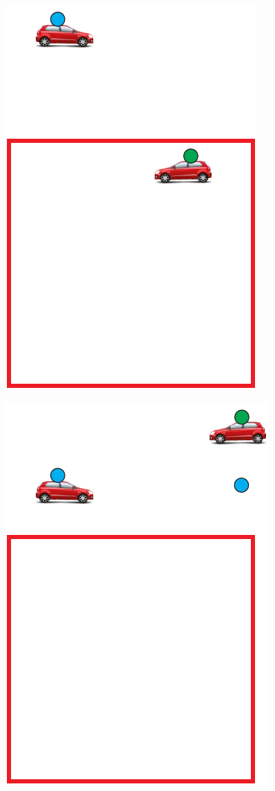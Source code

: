 \begin{figure}[htbp]
	\centering
	\begin{minipage}{0.33\textwidth}
	  \centering
	  \includegraphics[scale=0.5]{metodologia/figuras/veiculoSelecionadoDentroRA.pdf}
	  \label{fig:veiculoSelecionadoDentroRA}
	\end{minipage}%
	\begin{minipage}{0.33\textwidth}
	  \centering
	  \includegraphics[scale=0.5]{metodologia/figuras/destinoVeiculoSelecionadoDentroRA.pdf}

\end{minipage}
\end{figure}
